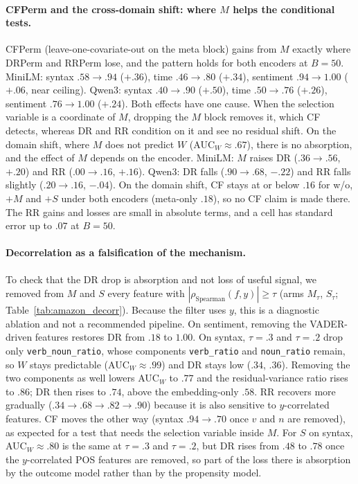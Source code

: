 \paragraph{CFPerm and the cross-domain shift: where $M$ helps the conditional tests.}
CFPerm (leave-one-covariate-out on the meta block) gains from $M$ exactly where DRPerm and RRPerm lose,
and the pattern holds for both encoders at $B{=}50$.
MiniLM: syntax $.58\to.94$ ($+.36$), time $.46\to.80$ ($+.34$), sentiment $.94\to1.00$ ($+.06$, near ceiling).
Qwen3: syntax $.40\to.90$ ($+.50$), time $.50\to.76$ ($+.26$), sentiment $.76\to1.00$ ($+.24$).
Both effects have one cause.
When the selection variable is a coordinate of $M$, dropping the $M$ block removes it, which CF detects,
whereas DR and RR condition on it and see no residual shift.
On the domain shift, where $M$ does not predict $W$ (AUC$_W\approx.67$), there is no absorption, and the
effect of $M$ depends on the encoder.
MiniLM: $M$ raises DR ($.36\to.56$, $+.20$) and RR ($.00\to.16$, $+.16$).
Qwen3: DR falls ($.90\to.68$, $-.22$) and RR falls slightly ($.20\to.16$, $-.04$).
On the domain shift, CF stays at or below $.16$ for w/o, $+M$ and $+S$ under both encoders
(meta-only $.18$), so no CF claim is made there.
The RR gains and losses are small in absolute terms, and a cell has standard error up to $.07$ at $B{=}50$.

\paragraph{Decorrelation as a falsification of the mechanism.}
To check that the DR drop is absorption and not loss of useful signal, we removed from $M$ and $S$
every feature with $|\rho_{\mathrm{Spearman}}(f,y)|\ge\tau$ (arms $M_\tau$, $S_\tau$;
Table~\ref{tab:amazon_decorr}).
Because the filter uses $y$, this is a diagnostic ablation and not a recommended pipeline.
On sentiment, removing the VADER-driven features restores DR from $.18$ to $1.00$.
On syntax, $\tau=.3$ and $\tau=.2$ drop only \texttt{verb\_noun\_ratio}, whose components
\texttt{verb\_ratio} and \texttt{noun\_ratio} remain, so $W$ stays predictable (AUC$_W\approx.99$) and DR stays
low ($.34$, $.36$).
Removing the two components as well lowers AUC$_W$ to $.77$ and the residual-variance ratio rises to $.86$;
DR then rises to $.74$, above the embedding-only $.58$.
RR recovers more gradually ($.34\to.68\to.82\to.90$) because it is also sensitive to $y$-correlated features.
CF moves the other way (syntax $.94\to.70$ once $v$ and $n$ are removed), as expected for a test that needs
the selection variable inside $M$.
For $S$ on syntax, AUC$_W\approx.80$ is the same at $\tau=.3$ and $\tau=.2$, but DR rises from $.48$ to $.78$
once the $y$-correlated POS features are removed, so part of the loss there is absorption by the outcome
model rather than by the propensity model.

